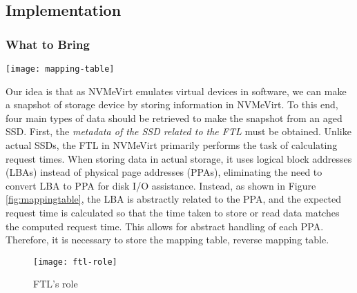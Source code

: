 \begin{comment}
Conversely, NVMeVirt provides developers with the flexibility to easily modify the NVMe interface layer, allowing them to explore various design spaces and support new device types.
Additionally, by not relying on virtualization technology, it can implement a comprehensive communication model with low overhead, and the modular design facilitates easy module loading.
Thanks to these characteristics, we proceeded with our research based on NVMeVirt.
Furthermore, leveraging NVMeVirt offers the additional advantage of direct access to the FTL.
\end{comment}


\subsection{Implementation}

\subsubsection{What to Bring}

\begin{figure*}[t]
    \centering
    \texttt{[image: mapping-table]}
    \caption{NVMeVirt’s relation between FTL and data save process}
    \label{fig:mappingtable}
\end{figure*}

Our idea is that as NVMeVirt emulates virtual devices in software, we can make a snapshot of storage device by storing information in NVMeVirt.
To this end, four main types of data should be retrieved to make the snapshot from an aged SSD.
First, the \emph{metadata of the SSD related to the FTL} must be obtained.
Unlike actual SSDs, the FTL in NVMeVirt primarily performs the task of calculating request times.
When storing data in actual storage, it uses logical block addresses (LBAs) instead of physical page addresses (PPAs), eliminating the need to convert LBA to PPA for disk I/O assistance.
Instead, as shown in Figure \ref{fig:mappingtable}, the LBA is abstractly related to the PPA, and the expected request time is calculated so that the time taken to store or read data matches the computed request time.
This allows for abstract handling of each PPA.
Therefore, it is necessary to store the mapping table, reverse mapping table.


\begin{figure}[t]
    \centering
    \texttt{[image: ftl-role]}
    \caption{FTL’s role}
    \label{fig:role}
\end{figure}

